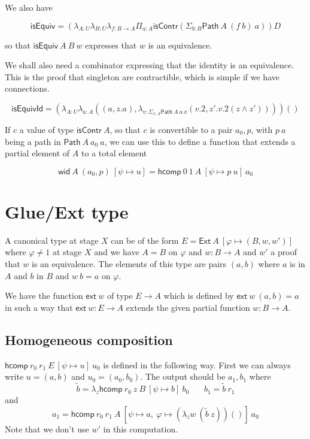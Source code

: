 \documentclass[10pt,a4paper]{article}
\newcommand{\isContr}{\mathsf{isContr}}
\newcommand{\isEquiv}{\mathsf{isEquiv}}
\newcommand{\isEquivId}{\mathsf{isEquivId}}
\newcommand{\Path}{\mathsf{Path}}
\newcommand{\Ext}{\mathsf{Ext}}
\newcommand{\ext}{\mathsf{ext}}
\newcommand{\wid}{\mathsf{wid}}
\newcommand{\hcomp}{\mathsf{hcomp}}
\begin{document}
\medskip

We also have

$$
\isEquiv = (\lambda_{A:U}\lambda_{B:U}\lambda_{f:B\rightarrow A}\Pi_{a:A}
\isContr(\Sigma_{b:B}\Path~A~(f~b)~a))D$$

so that $\isEquiv~A~B~w$ expresses that $w$ is an equivalence.
         
We shall also need a combinator expressing that the identity is an equivalence.
This is the proof that singleton are contractible, which is simple if we have connections.

$$
\isEquivId =
(\lambda_{A:U}\lambda_{a:A}((a,z.a),\lambda_{v:\Sigma_{x:A}\Path~A~a~x}(v.2,z'.v.2(z\wedge z'))))()
$$


If $c$ a value of type $\isContr~A$, so that $c$ is convertible to a pair $a_0,p$, with
$p~a$ being a path in $\Path~A~a_0~a$,
we can use this to define a function that extends a partial element of $A$ to a total element

$$
\wid~A~(a_0,p)~[\psi\mapsto u] = \hcomp~0~1~A~[\psi\mapsto p~u]~a_0
$$


\section*{Glue/Ext type}

A canonical type at stage $X$ can be of the form $E = \Ext~A~[\varphi\mapsto (B,w,w')]$
where $\varphi\neq 1$ at stage $X$ and we have $A = B$ on $\varphi$ and $w:B\rightarrow A$
and $w'$ a proof that $w$ is an equivalence. The elements of this type are pairs $(a,b)$ where
$a$ is in $A$ and $b$ in $B$ and $w~b= a$ on $\varphi$.

We have the function $\ext~w$ of type $E\rightarrow A$ which is defined by $\ext~w~(a,b) = a$
in such a way that $\ext~w:E\rightarrow A$ extends the given partial function $w:B\rightarrow A$.

\subsection*{Homogeneous composition}

$\hcomp~r_0~r_1~E~[\psi\mapsto u]~u_0$ is defined in the following way. First we can always write
$u = (a,b)$ and $u_0 = (a_0,b_0)$. The output should be $a_1,b_1$ where
$$
\tilde{b} = \lambda_z\hcomp~r_0~z~B~[\psi\mapsto b]~b_0~~~~~~~~b_1 = \tilde{b}~r_1
$$
and
$$
a_1 = \hcomp~r_0~r_1~A~[\psi\mapsto a,~\varphi\mapsto (\lambda_z w~(\tilde{b}~z))()]~a_0
$$
Note that we don't use $w'$ in this computation.
\end{document}
